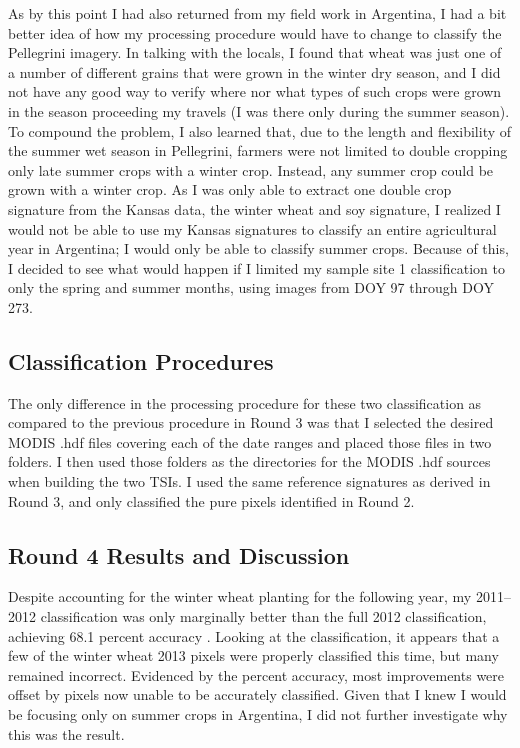 As by this point I had also returned from my field work in Argentina, I had a bit better idea of how my processing procedure would have to change to classify the Pellegrini imagery. In talking with the locals, I found that wheat was just one of a number of different grains that were grown in the winter dry season, and I did not have any good way to verify where nor what types of such crops were grown in the season proceeding my travels (I was there only during the summer season). To compound the problem, I also learned that, due to the length and flexibility of the summer wet season in Pellegrini, farmers were not limited to double cropping only late summer crops with a winter crop. Instead, any summer crop could be grown with a winter crop. As I was only able to extract one double crop signature from the Kansas data, the winter wheat and soy signature, I realized I would not be able to use my Kansas signatures to classify an entire agricultural year in Argentina; I would only be able to classify summer crops. Because of this, I decided to see what would happen if I limited my sample site 1 classification to only the spring and summer months, using images from DOY 97 through DOY 273.

\subsection*{Classification Procedures}

The only difference in the processing procedure for these two classification as compared to the previous procedure in Round 3 was that I selected the desired MODIS .hdf files covering each of the date ranges and placed those files in two folders. I then used those folders as the directories for the MODIS .hdf sources when building the two TSIs. I used the same reference signatures as derived in Round 3, and only classified the pure pixels identified in Round 2.

\subsection*{Round 4 Results and Discussion}

Despite accounting for the winter wheat planting for the following year, my 2011--2012 classification was only marginally better than the full 2012 classification, achieving 68.1 percent accuracy . Looking at the classification, it appears that a few of the winter wheat 2013 pixels were properly classified this time, but many remained incorrect. Evidenced by the percent accuracy, most improvements were offset by pixels now unable to be accurately classified. Given that I knew I would be focusing only on summer crops in Argentina, I did not further investigate why this was the result.

